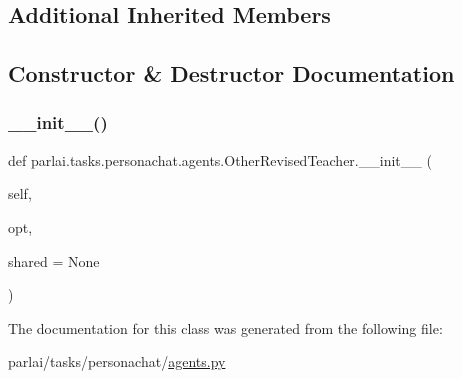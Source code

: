 \subsection*{Additional Inherited Members}


\subsection{Constructor \& Destructor Documentation}
\mbox{\label{classparlai_1_1tasks_1_1personachat_1_1agents_1_1OtherRevisedTeacher_abb68640d48b19dae6529fb4e90decf78}} 
\subsubsection{\texorpdfstring{\+\_\+\+\_\+init\+\_\+\+\_\+()}{\_\_init\_\_()}}
{\footnotesize\ttfamily def parlai.\+tasks.\+personachat.\+agents.\+Other\+Revised\+Teacher.\+\_\+\+\_\+init\+\_\+\+\_\+ (\begin{DoxyParamCaption}\item[{}]{self,  }\item[{}]{opt,  }\item[{}]{shared = {\ttfamily None} }\end{DoxyParamCaption})}



The documentation for this class was generated from the following file\+:\begin{DoxyCompactItemize}
\item 
parlai/tasks/personachat/\hyperlink{parlai_2tasks_2personachat_2agents_8py}{agents.\+py}\end{DoxyCompactItemize}
